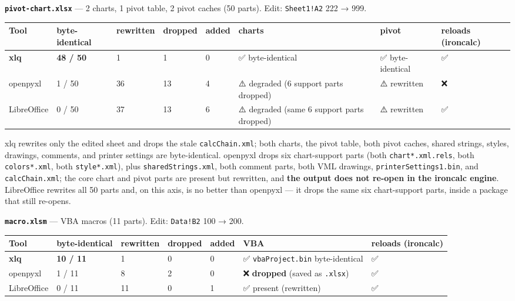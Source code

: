\documentclass[
]{article}
\newcounter{none} %
\begin{document}
\textbf{\texttt{pivot-chart.xlsx}} --- 2 charts, 1 pivot table, 2 pivot
caches (50 parts). Edit: \texttt{Sheet1!A2} 222 → 999.

{\def\LTcaptype{none} %
\begin{longtable}[]{@{}llllllll@{}}
\toprule\noalign{}
Tool & byte-identical & rewritten & dropped & added & charts & pivot &
reloads (ironcalc) \\
\midrule\noalign{}
\endhead
\bottomrule\noalign{}
\endlastfoot
\textbf{xlq} & \textbf{48 / 50} & 1 & 1 & 0 & ✅ byte-identical & ✅
byte-identical & ✅ \\
openpyxl & 1 / 50 & 36 & 13 & 4 & ⚠️ degraded (6 support parts dropped)
& ⚠️ rewritten & ❌ \\
LibreOffice & 0 / 50 & 37 & 13 & 6 & ⚠️ degraded (same 6 support parts
dropped) & ⚠️ rewritten & ✅ \\
\end{longtable}
}

xlq rewrites only the edited sheet and drops the stale
\texttt{calcChain.xml}; both charts, the pivot table, both pivot caches,
shared strings, styles, drawings, comments, and printer settings are
byte-identical. openpyxl drops six chart-support parts (both
\texttt{chart*.xml.rels}, both \texttt{colors*.xml}, both
\texttt{style*.xml}), plus \texttt{sharedStrings.xml}, both comment
parts, both VML drawings, \texttt{printerSettings1.bin}, and
\texttt{calcChain.xml}; the core chart and pivot parts are present but
rewritten, and \textbf{the output does not re-open in the ironcalc
engine}. LibreOffice rewrites all 50 parts and, on this axis, is no
better than openpyxl --- it drops the same six chart-support parts,
inside a package that still re-opens.

\textbf{\texttt{macro.xlsm}} --- VBA macros (11 parts). Edit:
\texttt{Data!B2} 100 → 200.

{\def\LTcaptype{none} %
\begin{longtable}[]{@{}lllllll@{}}
\toprule\noalign{}
Tool & byte-identical & rewritten & dropped & added & VBA & reloads
(ironcalc) \\
\midrule\noalign{}
\endhead
\bottomrule\noalign{}
\endlastfoot
\textbf{xlq} & \textbf{10 / 11} & 1 & 0 & 0 & ✅ \texttt{vbaProject.bin}
byte-identical & ✅ \\
openpyxl & 1 / 11 & 8 & 2 & 0 & ❌ \textbf{dropped} (saved as
\texttt{.xlsx}) & ✅ \\
LibreOffice & 0 / 11 & 11 & 0 & 1 & ✅ present (rewritten) & ✅ \\
\end{longtable}
}
\end{document}
